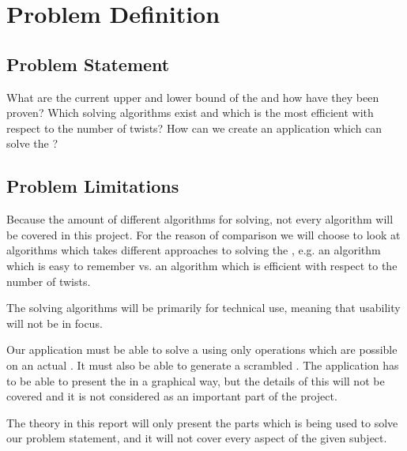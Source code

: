 \chapter{Problem Definition}
\section{Problem Statement}
What are the current upper and lower bound of the \rubik{} and how have they been proven? \newline\newline
Which solving algorithms exist and which is the most efficient with respect to the number of twists? \newline\newline
How can we create an application which can solve the \rubik{}?

\section{Problem Limitations}
Because the amount of different algorithms for \rubik{} solving, not every algorithm will be covered in this project.
For the reason of comparison we will choose to look at algorithms which takes different approaches to solving the \rubik{}, e.g. an algorithm which is easy to remember vs. an algorithm which is efficient with respect to the number of twists.

The \rubik{} solving algorithms will be primarily for technical use, meaning that usability will not be in focus.

Our application must be able to solve a \rubik{} using only operations which are possible on an actual \rubik{}.
It must also be able to generate a scrambled \rubik{}.
The application has to be able to present the \rubik{} in a graphical way, but the details of this will not be covered and it is not considered as an important part of the project.

The theory in this report will only present the parts which is being used to solve our problem statement, and it will not cover every aspect of the given subject.